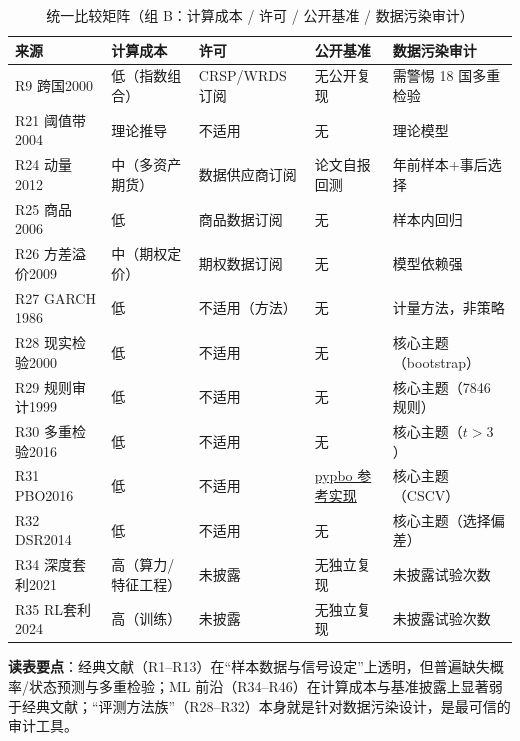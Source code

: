 \begin{table}[htbp]
\centering
\caption{统一比较矩阵（组 B：计算成本 / 许可 / 公开基准 / 数据污染审计）}
\label{tab:matrix_b}
\footnotesize
\begin{tabular}{@{}>{\raggedright\arraybackslash}p{1.4cm}>{\raggedright\arraybackslash}p{2.4cm}>{\raggedright\arraybackslash}p{3.0cm}>{\raggedright\arraybackslash}p{3.2cm}>{\raggedright\arraybackslash}p{3.6cm}@{}}
\toprule
来源 & 计算成本 & 许可 & 公开基准 & 数据污染审计 \\
\midrule
R9 跨国2000 & 低（指数组合） & CRSP/WRDS 订阅 & 无公开复现 & 需警惕 18 国多重检验 \\
R21 阈值带2004 & 理论推导 & 不适用 & 无 & 理论模型 \\
R24 动量2012 & 中（多资产期货） & 数据供应商订阅 & 论文自报回测 & 1990 年前样本+事后选择 \\
R25 商品2006 & 低 & 商品数据订阅 & 无 & 样本内回归 \\
R26 方差溢价2009 & 中（期权定价） & 期权数据订阅 & 无 & 模型依赖强 \\
R27 GARCH 1986 & 低 & 不适用（方法） & 无 & 计量方法，非策略 \\
R28 现实检验2000 & 低 & 不适用 & 无 & 核心主题（bootstrap） \\
R29 规则审计1999 & 低 & 不适用 & 无 & 核心主题（7846 规则） \\
R30 多重检验2016 & 低 & 不适用 & 无 & 核心主题（$t>3$） \\
R31 PBO2016 & 低 & 不适用 & \href{https://github.com/esvhd/pypbo}{pypbo 参考实现} & 核心主题（CSCV） \\
R32 DSR2014 & 低 & 不适用 & 无 & 核心主题（选择偏差） \\
R34 深度套利2021 & 高（算力/特征工程） & 未披露 & 无独立复现 & 未披露试验次数 \\
R35 RL套利2024 & 高（训练） & 未披露 & 无独立复现 & 未披露试验次数 \\
\bottomrule
\end{tabular}
\end{table}

\textbf{读表要点}：经典文献（R1--R13）在“样本数据与信号设定”上透明，但普遍缺失概率/状态预测与多重检验；ML 前沿（R34--R46）在计算成本与基准披露上显著弱于经典文献；“评测方法族”（R28--R32）本身就是针对数据污染设计，是最可信的审计工具。
